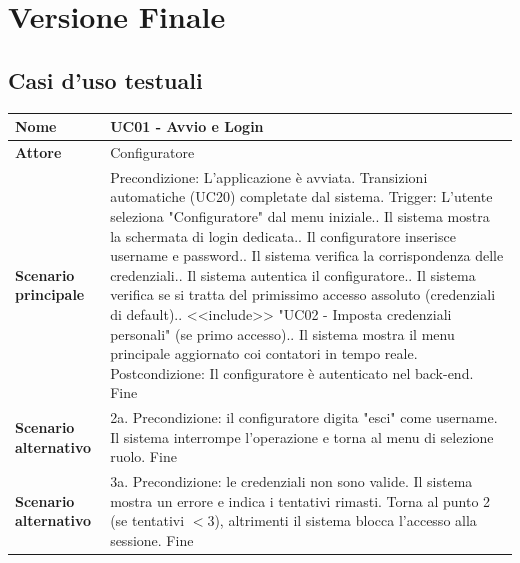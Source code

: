 \documentclass[12pt, a4paper, oneside]{report}
\begin{document}
\chapter{Versione Finale}
\section{Casi d'uso testuali}

\begin{table}[htbp]
    \centering
    \renewcommand{\arraystretch}{1.4} 
    \begin{tabularx}{\textwidth}{|l|X|}
    \hline
    \textbf{Nome}               & \textbf{UC01 - Avvio e Login} \\ \hline
    \textbf{Attore}             & Configuratore \\ \hline
    \textbf{Scenario principale} & 
    Precondizione: L'applicazione è avviata. Transizioni automatiche (UC20) completate dal sistema.\newline
    Trigger: L'utente seleziona "Configuratore" dal menu iniziale.\newline
    1. Il sistema mostra la schermata di login dedicata.\newline
    2. Il configuratore inserisce username e password.\newline
    3. Il sistema verifica la corrispondenza delle credenziali.\newline
    4. Il sistema autentica il configuratore.\newline
    5. Il sistema verifica se si tratta del primissimo accesso assoluto (credenziali di default).\newline
    6. <<include>> "UC02 - Imposta credenziali personali" (se primo accesso).\newline
    7. Il sistema mostra il menu principale aggiornato coi contatori in tempo reale.\newline
    Postcondizione: Il configuratore è autenticato nel back-end.\newline
    Fine \\ \hline
    \textbf{Scenario alternativo} & 
    2a. Precondizione: il configuratore digita "esci" come username.\newline
    Il sistema interrompe l'operazione e torna al menu di selezione ruolo.\newline
    Fine \\ \hline
    \textbf{Scenario alternativo} & 
    3a. Precondizione: le credenziali non sono valide.\newline
    Il sistema mostra un errore e indica i tentativi rimasti.\newline
    Torna al punto 2 (se tentativi $< 3$), altrimenti il sistema blocca l'accesso alla sessione.\newline
    Fine \\ \hline
    \end{tabularx}
    \label{tab:uc01_v3}
\end{table}
\end{document}
